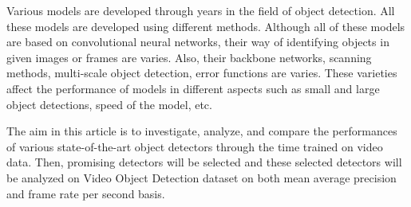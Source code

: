 \documentclass{article}
\begin{document}
\setlength{\parindent}{6ex}

\indent

Various models are developed through years in the field of object detection. 
All these models are developed using different methods. Although all of these
models are based on convolutional neural networks, their way of identifying objects
in given images or frames are varies. Also, their backbone networks, scanning methods, 
multi-scale object detection, error functions are varies. These varieties affect the 
performance of models in different aspects such as small and large object detections,
speed of the model, etc. \par

The aim in this article is to investigate, analyze, and compare the performances of
various state-of-the-art object detectors through the time trained on video data. Then, 
promising detectors will be selected and these selected detectors will be analyzed on
Video Object Detection dataset on both mean average precision and frame rate per second 
basis. 
\end{document}
